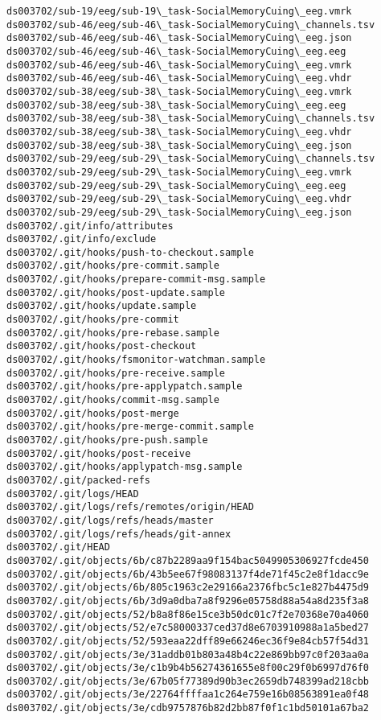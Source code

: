 \documentclass[11pt]{article}
\begin{document}
\begin{Verbatim}[commandchars=\\\{\}]
ds003702/sub-19/eeg/sub-19\_task-SocialMemoryCuing\_eeg.vmrk
ds003702/sub-46/eeg/sub-46\_task-SocialMemoryCuing\_channels.tsv
ds003702/sub-46/eeg/sub-46\_task-SocialMemoryCuing\_eeg.json
ds003702/sub-46/eeg/sub-46\_task-SocialMemoryCuing\_eeg.eeg
ds003702/sub-46/eeg/sub-46\_task-SocialMemoryCuing\_eeg.vmrk
ds003702/sub-46/eeg/sub-46\_task-SocialMemoryCuing\_eeg.vhdr
ds003702/sub-38/eeg/sub-38\_task-SocialMemoryCuing\_eeg.vmrk
ds003702/sub-38/eeg/sub-38\_task-SocialMemoryCuing\_eeg.eeg
ds003702/sub-38/eeg/sub-38\_task-SocialMemoryCuing\_channels.tsv
ds003702/sub-38/eeg/sub-38\_task-SocialMemoryCuing\_eeg.vhdr
ds003702/sub-38/eeg/sub-38\_task-SocialMemoryCuing\_eeg.json
ds003702/sub-29/eeg/sub-29\_task-SocialMemoryCuing\_channels.tsv
ds003702/sub-29/eeg/sub-29\_task-SocialMemoryCuing\_eeg.vmrk
ds003702/sub-29/eeg/sub-29\_task-SocialMemoryCuing\_eeg.eeg
ds003702/sub-29/eeg/sub-29\_task-SocialMemoryCuing\_eeg.vhdr
ds003702/sub-29/eeg/sub-29\_task-SocialMemoryCuing\_eeg.json
ds003702/.git/info/attributes
ds003702/.git/info/exclude
ds003702/.git/hooks/push-to-checkout.sample
ds003702/.git/hooks/pre-commit.sample
ds003702/.git/hooks/prepare-commit-msg.sample
ds003702/.git/hooks/post-update.sample
ds003702/.git/hooks/update.sample
ds003702/.git/hooks/pre-commit
ds003702/.git/hooks/pre-rebase.sample
ds003702/.git/hooks/post-checkout
ds003702/.git/hooks/fsmonitor-watchman.sample
ds003702/.git/hooks/pre-receive.sample
ds003702/.git/hooks/pre-applypatch.sample
ds003702/.git/hooks/commit-msg.sample
ds003702/.git/hooks/post-merge
ds003702/.git/hooks/pre-merge-commit.sample
ds003702/.git/hooks/pre-push.sample
ds003702/.git/hooks/post-receive
ds003702/.git/hooks/applypatch-msg.sample
ds003702/.git/packed-refs
ds003702/.git/logs/HEAD
ds003702/.git/logs/refs/remotes/origin/HEAD
ds003702/.git/logs/refs/heads/master
ds003702/.git/logs/refs/heads/git-annex
ds003702/.git/HEAD
ds003702/.git/objects/6b/c87b2289aa9f154bac5049905306927fcde450
ds003702/.git/objects/6b/43b5ee67f98083137f4de71f45c2e8f1dacc9e
ds003702/.git/objects/6b/805c1963c2e29166a2376fbc5c1e827b4475d9
ds003702/.git/objects/6b/3d9a0dba7a8f9296e05758d88a54a8d235f3a8
ds003702/.git/objects/52/b8a8f86e15ce3b50dc01c7f2e70368e70a4060
ds003702/.git/objects/52/e7c58000337ced37d8e6703910988a1a5bed27
ds003702/.git/objects/52/593eaa22dff89e66246ec36f9e84cb57f54d31
ds003702/.git/objects/3e/31addb01b803a48b4c22e869bb97c0f203aa0a
ds003702/.git/objects/3e/c1b9b4b56274361655e8f00c29f0b6997d76f0
ds003702/.git/objects/3e/67b05f77389d90b3ec2659db748399ad218cbb
ds003702/.git/objects/3e/22764ffffaa1c264e759e16b08563891ea0f48
ds003702/.git/objects/3e/cdb9757876b82d2bb87f0f1c1bd50101a67ba2

\end{Verbatim}
\end{document}
